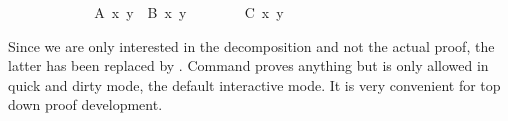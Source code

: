 \begin{isabellebody}
\ \ \ \ \isamarkupfalse%
\isanewline
\ \ \ \ \ \ \isamarkupfalse%
\ {}A\ x\ y\ {}\ B\ x\ y{}\isanewline
\ \ \ \ \ \ \isamarkupfalse%
\ {}C\ x\ y{}\ \isamarkupfalse%
\isanewline
\ \ \ \ \isamarkupfalse%
\isanewline
\ \ \isamarkupfalse%
\isanewline
{}\isamarkupfalse%
%
\endisatagproof
{\isafoldproof}%
%
\isadelimproof
%
\endisadelimproof
%
\begin{isamarkuptext}%
\noindent Since we are only interested in the decomposition and not the
actual proof, the latter has been replaced by
. Command  proves anything but is
only allowed in quick and dirty mode, the default interactive mode. It
is very convenient for top down proof development.


\end{isamarkuptext}
\end{isabellebody}
